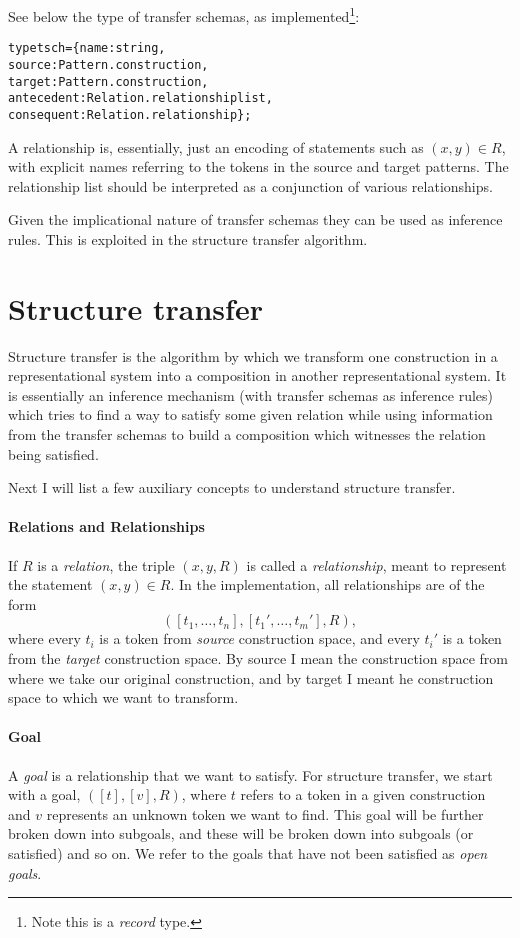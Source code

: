 \documentclass[a4paper]{article}
\theoremstyle{definition}
\begin{document}
	See below the type of transfer schemas, as implemented\footnote{Note this is a \textit{record} type.}:
	\begin{alltt}
type tsch = \{name : string,
             source : Pattern.construction,
             target : Pattern.construction,
             antecedent : Relation.relationship list,
             consequent : Relation.relationship\};
	\end{alltt}
	A relationship is, essentially, just an encoding of statements such as $(x,y)\in R$, with explicit names referring to the tokens in the source and target patterns. The relationship list should be interpreted as a conjunction of various relationships.

	Given the implicational nature of transfer schemas they can be used as inference rules. This is exploited in the structure transfer algorithm.

	\section{Structure transfer}
	Structure transfer is the algorithm by which we transform one construction in a representational system into a composition in another representational system. It is essentially an inference mechanism (with transfer schemas as inference rules) which tries to find a way to satisfy some given relation while using information from the transfer schemas to build a composition which witnesses the relation being satisfied.

	Next I will list a few auxiliary concepts to understand structure transfer.
	\paragraph{Relations and Relationships}
	If $R$ is a \textit{relation}, the triple $(x,y,R)$ is called a \textit{relationship}, meant to represent the statement $(x,y) \in R$. In the implementation, all relationships are of the form $$([t_1,\ldots,t_n],[t_1',\ldots,t_m'],R),$$ where every $t_i$ is a token from \textit{source} construction space, and every $t_i'$ is a token from the \textit{target} construction space. By source I mean the construction space from where we take our original construction, and by target I meant he construction space to which we want to transform.

	\paragraph{Goal} A \textit{goal} is a relationship that we want to satisfy. For structure transfer, we start with a goal, $([t],[v],R)$, where $t$ refers to a token in a given construction and $v$ represents an unknown token we want to find. This goal will be further broken down into subgoals, and these will be broken down into subgoals (or satisfied) and so on. We refer to the goals that have not been satisfied as \textit{open goals}.
\end{document}
